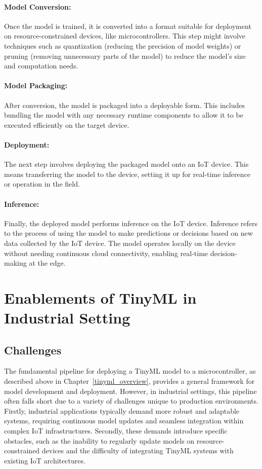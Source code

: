 \documentclass[twocolumn]{article}
\begin{document}
\paragraph{Model Conversion:}
	Once the model is trained, it is converted into a format suitable for deployment on resource-constrained devices, like microcontrollers. This step might involve techniques such as quantization (reducing the precision of model weights) or pruning (removing unnecessary parts of the model) to reduce the model’s size and computation needs.\\[0.10cm]
\paragraph{Model Packaging:}
	After conversion, the model is packaged into a deployable form. This includes bundling the model with any necessary runtime components to allow it to be executed efficiently on the target device.\\[0.10cm]
\paragraph{Deployment:}
	The next step involves deploying the packaged model onto an IoT device. This means transferring the model to the device, setting it up for real-time inference or operation in the field.\\[0.10cm]
\paragraph{Inference:}
	Finally, the deployed model performs inference on the IoT device. Inference refers to the process of using the model to make predictions or decisions based on new data collected by the IoT device. The model operates locally on the device without needing continuous cloud connectivity, enabling real-time decision-making at the edge.\\[0.10cm]



\section{Enablements of TinyML in Industrial Setting}
\label{prod_tinyml}

\subsection{Challenges}

The fundamental pipeline for deploying a TinyML model to a microcontroller, as described above in Chapter~\ref{tinyml_overview}, provides a general framework for model development and deployment. However, in industrial settings, this pipeline often falls short due to a variety of challenges unique to production environments. Firstly, industrial applications typically demand more robust and adaptable systems, requiring continuous model updates and seamless integration within complex IoT infrastructures. Secondly, these demands introduce specific obstacles, such as the inability to regularly update models on resource-constrained devices and the difficulty of integrating TinyML systems with existing IoT architectures.
\end{document}
